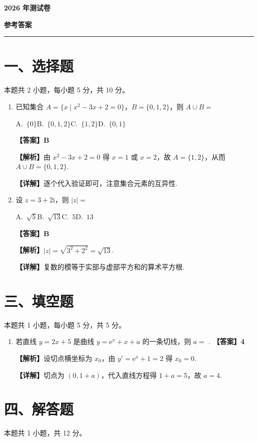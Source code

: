 \documentclass[12pt,a4paper]{ctexart}
\newcommand{\daan}[1]{{\color{red}\textbf{【答案】#1}}}
\newcommand{\jieti}{\par{\color{gray!60!black}\textbf{【解析】}}}
\newcommand{\xijie}{\par{\color{blue!60!black}\textbf{【详解】}}}
\newcommand{\mi}{\mathrm{i}}
\newcommand{\me}{\mathrm{e}}
\newcommand{\blank}{\underline{\hspace{2cm}}}
\begin{document}
\begin{center}
    {\Large\textbf{2026 年测试卷}}
    \vspace{0.5em}

    {\large\textbf{参考答案}}
    \vspace{0.5em}
    \hrule
\end{center}

\section*{一、选择题}
本题共 2 小题，每小题 5 分，共 10 分。

\begin{enumerate}
    \item 已知集合 $A=\{x \mid x^2-3x+2=0\}$，$B=\{0,1,2\}$，则 $A \cup B =$
    \begin{flushleft}
        A.\ $\{0\}$\quad B.\ $\{0,1,2\}$\quad C.\ $\{1,2\}$\quad D.\ $\{0,1\}$
    \end{flushleft}
    \daan{B}
    \jieti 由 $x^{2}-3x+2=0$ 得 $x=1$ 或 $x=2$，故 $A=\{1,2\}$，从而 $A\cup B=\{0,1,2\}$.
    \xijie 逐个代入验证即可，注意集合元素的互异性.

    \item 设 $z = 3 + 2\mi$，则 $|z| =$
    \begin{flushleft}
        A.\ $\sqrt{5}$\quad B.\ $\sqrt{13}$\quad C.\ $5$\quad D.\ $13$
    \end{flushleft}
    \daan{B}
    \jieti $|z|=\sqrt{3^{2}+2^{2}}=\sqrt{13}$.
    \xijie 复数的模等于实部与虚部平方和的算术平方根.
\end{enumerate}

\section*{三、填空题}
本题共 1 小题，每小题 5 分，共 5 分。

\begin{enumerate}[resume]
    \item 若直线 $y=2x+5$ 是曲线 $y=\me^{x}+x+a$ 的一条切线，则 $a=$ \blank.
    \daan{4}
    \jieti 设切点横坐标为 $x_0$，由 $y'=\me^{x}+1=2$ 得 $x_0=0$.
    \xijie 切点为 $(0,1+a)$，代入直线方程得 $1+a=5$，故 $a=4$.
\end{enumerate}

\section*{四、解答题}
本题共 1 小题，共 12 分。
\end{document}
